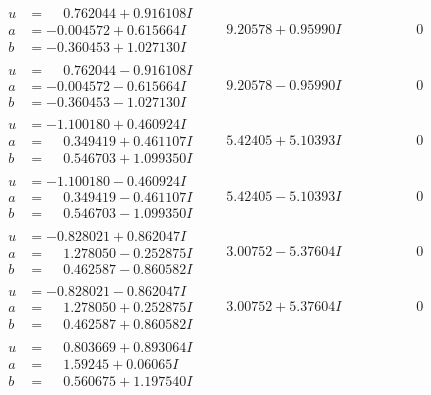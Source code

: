 \documentclass[1p]{elsarticle_modified}
\theoremstyle{definition}
\begin{document}
$$\begin{array}{c|c|c}
\begin{aligned}
u &= \phantom{-}0.762044 + 0.916108 I \\
a &= -0.004572 + 0.615664 I \\
b &= -0.360453 + 1.027130 I\end{aligned}
 & \phantom{-}9.20578 + 0.95990 I & \phantom{-0.000000 } 0 \\ \hline\begin{aligned}
u &= \phantom{-}0.762044 - 0.916108 I \\
a &= -0.004572 - 0.615664 I \\
b &= -0.360453 - 1.027130 I\end{aligned}
 & \phantom{-}9.20578 - 0.95990 I & \phantom{-0.000000 } 0 \\ \hline\begin{aligned}
u &= -1.100180 + 0.460924 I \\
a &= \phantom{-}0.349419 + 0.461107 I \\
b &= \phantom{-}0.546703 + 1.099350 I\end{aligned}
 & \phantom{-}5.42405 + 5.10393 I & \phantom{-0.000000 } 0 \\ \hline\begin{aligned}
u &= -1.100180 - 0.460924 I \\
a &= \phantom{-}0.349419 - 0.461107 I \\
b &= \phantom{-}0.546703 - 1.099350 I\end{aligned}
 & \phantom{-}5.42405 - 5.10393 I & \phantom{-0.000000 } 0 \\ \hline\begin{aligned}
u &= -0.828021 + 0.862047 I \\
a &= \phantom{-}1.278050 - 0.252875 I \\
b &= \phantom{-}0.462587 - 0.860582 I\end{aligned}
 & \phantom{-}3.00752 - 5.37604 I & \phantom{-0.000000 } 0 \\ \hline\begin{aligned}
u &= -0.828021 - 0.862047 I \\
a &= \phantom{-}1.278050 + 0.252875 I \\
b &= \phantom{-}0.462587 + 0.860582 I\end{aligned}
 & \phantom{-}3.00752 + 5.37604 I & \phantom{-0.000000 } 0 \\ \hline\begin{aligned}
u &= \phantom{-}0.803669 + 0.893064 I \\
a &= \phantom{-}1.59245 + 0.06065 I \\
b &= \phantom{-}0.560675 + 1.197540 I\end{aligned}

\end{array}$$
\end{document}
